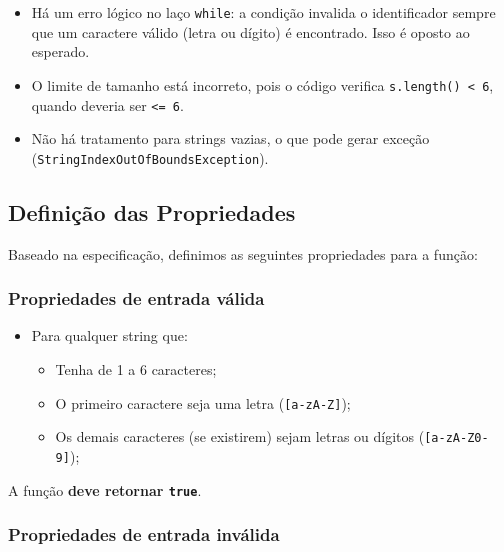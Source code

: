 \documentclass[
  letterpaper,
  DIV=11,
  numbers=noendperiod]{scrartcl}
\providecommand{\tightlist}{%
  \setlength{\itemsep}{0pt}\setlength{\parskip}{0pt}}
\begin{document}
\begin{itemize}
\tightlist
\item
  Há um erro lógico no laço \texttt{while}: a condição invalida o
  identificador sempre que um caractere válido (letra ou dígito) é
  encontrado. Isso é oposto ao esperado.
\item
  O limite de tamanho está incorreto, pois o código verifica
  \texttt{s.length()\ \textless{}\ 6}, quando deveria ser
  \texttt{\textless{}=\ 6}.
\item
  Não há tratamento para strings vazias, o que pode gerar exceção
  (\texttt{StringIndexOutOfBoundsException}).
\end{itemize}

\subsection{Definição das
Propriedades}\label{definiuxe7uxe3o-das-propriedades}

Baseado na especificação, definimos as seguintes propriedades para a
função:

\subsubsection{\texorpdfstring{\textbf{Propriedades de entrada
válida}}{Propriedades de entrada válida}}\label{propriedades-de-entrada-vuxe1lida}

\begin{itemize}
\tightlist
\item
  Para qualquer string que:

  \begin{itemize}
  \tightlist
  \item
    Tenha de 1 a 6 caracteres;
  \item
    O primeiro caractere seja uma letra (\texttt{{[}a-zA-Z{]}});
  \item
    Os demais caracteres (se existirem) sejam letras ou dígitos
    (\texttt{{[}a-zA-Z0-9{]}});
  \end{itemize}
\end{itemize}

A função \textbf{deve retornar \texttt{true}}.

\subsubsection{\texorpdfstring{\textbf{Propriedades de entrada
inválida}}{Propriedades de entrada inválida}}\label{propriedades-de-entrada-invuxe1lida}
\end{document}
